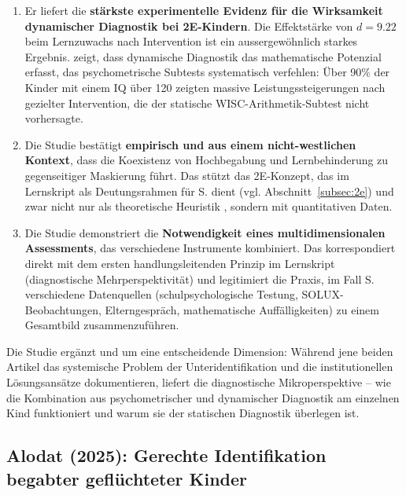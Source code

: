 \documentclass[ngerman, a4paper]{article}
\begin{document}
\begin{enumerate}
  \item Er liefert die \textbf{stärkste experimentelle Evidenz für die
    Wirksamkeit dynamischer Diagnostik bei 2E-Kindern}. Die Effektstärke
    von $d = 9.22$ beim Lernzuwachs nach Intervention ist ein
    aussergewöhnlich starkes Ergebnis. \textcite{alhroub2021utility} zeigt, dass dynamische
    Diagnostik das mathematische Potenzial erfasst, das psychometrische
    Subtests systematisch verfehlen: Über 90\% der Kinder mit einem IQ
    über 120 zeigten massive Leistungssteigerungen nach gezielter
    Intervention, die der statische WISC-Arithmetik-Subtest nicht
    vorhersagte.
  \item Die Studie bestätigt \textbf{empirisch und aus einem
    nicht-westlichen Kontext}, dass die Koexistenz von Hochbegabung und
    Lernbehinderung zu gegenseitiger Maskierung führt. Das stützt das
    2E-Konzept, das im Lernskript als Deutungsrahmen für S. dient
    (vgl. Abschnitt~\ref{subsec:2e}) und zwar nicht nur als theoretische
    Heuristik \parencite{webb2020doppeldiagnosen}, sondern mit
    quantitativen Daten.
  \item Die Studie demonstriert die \textbf{Notwendigkeit eines
    multidimensionalen Assessments}, das verschiedene Instrumente
    kombiniert. Das korrespondiert direkt mit dem ersten
    handlungsleitenden Prinzip im Lernskript (diagnostische
    Mehrperspektivität) und legitimiert die Praxis, im Fall S.
    verschiedene Datenquellen (schulpsychologische Testung,
    SOLUX-Beobachtungen, Elterngespräch, mathematische Auffälligkeiten)
    zu einem Gesamtbild zusammenzuführen.
\end{enumerate}

Die Studie ergänzt \textcite{mun2020identifying} und
\textcite{gubbins2020promising} um eine entscheidende Dimension: Während
jene beiden Artikel das systemische Problem der Unteridentifikation und die
institutionellen Lösungsansätze dokumentieren, liefert
\textcite{alhroub2021utility} die diagnostische Mikroperspektive -- wie die
Kombination aus psychometrischer und dynamischer Diagnostik am einzelnen
Kind funktioniert und warum sie der statischen Diagnostik überlegen ist.


\subsection*{Alodat (2025): Gerechte Identifikation begabter
  geflüchteter Kinder}
\label{subsec:alodat2025}
\end{document}
